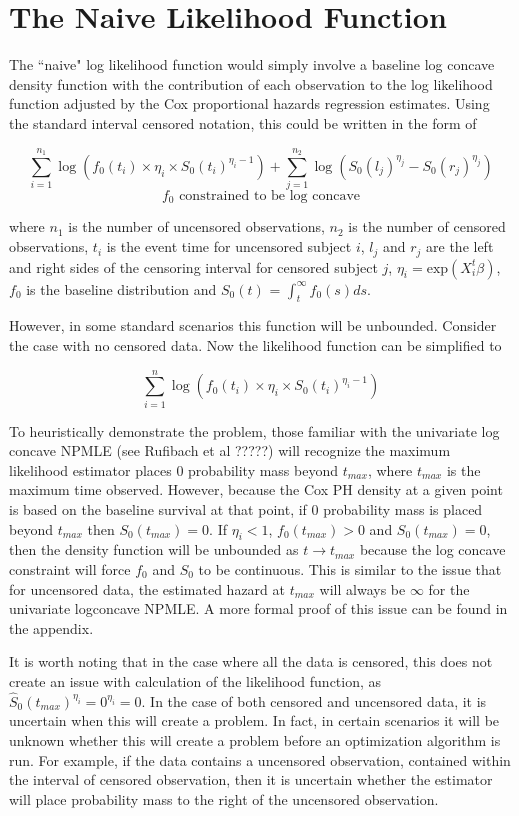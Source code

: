 \documentclass[11pt]{article}
\numberwithin{equation}{section}
\begin{document}
{\section{The Naive Likelihood Function} 
\label{sec:Naive}	}				

	The ``naive" log likelihood function would simply involve a baseline log concave density function with the contribution of each observation to the log likelihood function adjusted by the Cox proportional hazards regression estimates. Using the standard interval censored notation, this could be written in the form of 

\[
	\displaystyle \sum_{i = 1}^{n_1} \log (f_0(t_i) \times \eta_i \times S_0(t_i)^{\eta_i - 1})  +
	\displaystyle \sum_{j = 1}^{n_2} \log( S_0( l_j )^{\eta_j} - S_0({r_j})^{\eta_j} ) 
\]	
\[
	f_0 \text{ constrained to be log concave}
\]
	
	where $n_1$ is the number of uncensored observations, $n_2$ is the number of censored observations, $t_i$ is the event time for uncensored subject $i$, $l_j$ and $r_j$ are the left and right sides of the censoring interval for censored subject $j$, $\eta_i = \mathrm{exp}(X_i^t \beta)$, $f_0$ is the baseline distribution and $S_0(t)$ = $\int_t^\infty f_0(s) ds$.
	
	However, in some standard scenarios this function will be unbounded. Consider the case with no censored data. Now the likelihood function can be simplified to 
	
	\[
	\displaystyle \sum_{i = 1}^n \log (f_0(t_i) \times \eta_i \times S_0(t_i)^{\eta_i - 1} ) 
	\]
	
	To heuristically demonstrate the problem, those familiar with the univariate log concave NPMLE (see Rufibach et al ?????) will recognize the maximum likelihood estimator places 0 probability mass beyond $t_{max}$, where $t_{max}$ is the maximum time observed. However, because the Cox PH density at a given point is based on the baseline survival at that point, if 0 probability mass is placed beyond $t_{max}$ then $S_0(t_{max}) = 0$. If $\eta_i < 1$, $f_0(t_{max}) > 0$ and $S_0(t_{max}) = 0$, then the density function will be unbounded as $t \rightarrow t_{max}$  because the log concave constraint will force $f_0$ and $S_0$ to be continuous. This is similar to the issue that for uncensored data, the estimated hazard at $t_{max}$ will always be $\infty$ for the univariate logconcave NPMLE. A more formal proof of this issue can be found in the appendix. 
	
	It is worth noting that in the case where all the data is censored, this does not create an issue with calculation of the likelihood function, as $\hat S_0(t_{max})^{\eta_i} = 0^{\eta_i}=0 $. In the case of both censored and uncensored data, it is uncertain when this will create a problem. In fact, in certain scenarios it will be unknown whether this will create a problem before an optimization algorithm is run. For example, if the data contains a uncensored observation, contained within the interval of censored observation, then it is uncertain whether the estimator will place probability mass to the right of the uncensored observation. 
	
\end{document}
